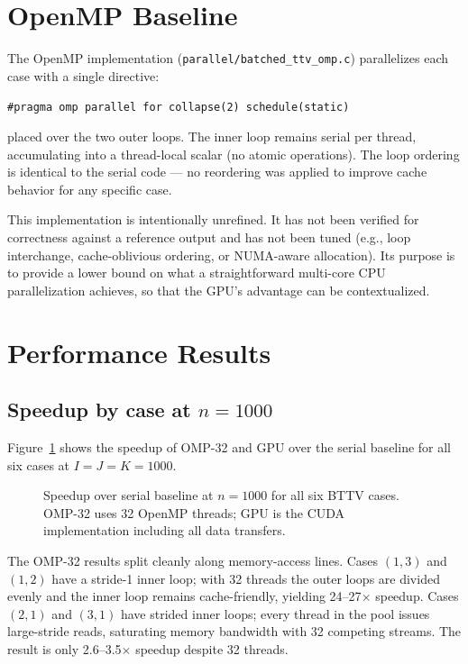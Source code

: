 \documentclass[11pt]{article}
\begin{document}
\section{OpenMP Baseline}

The OpenMP implementation (\texttt{parallel/batched\_ttv\_omp.c})
parallelizes each case with a single directive:
\begin{center}
\texttt{\#pragma omp parallel for collapse(2) schedule(static)}
\end{center}
placed over the two outer loops.  The inner loop remains serial per
thread, accumulating into a thread-local scalar (no atomic operations).
The loop ordering is identical to the serial code --- no reordering was
applied to improve cache behavior for any specific case.

This implementation is intentionally unrefined.  It has not been
verified for correctness against a reference output and has not been
tuned (e.g., loop interchange, cache-oblivious ordering, or NUMA-aware
allocation).  Its purpose is to provide a lower bound on what a
straightforward multi-core CPU parallelization achieves, so that the
GPU's advantage can be contextualized.

\section{Performance Results}

\subsection{Speedup by case at $n = 1000$}

Figure~\ref{fig:speedup} shows the speedup of OMP-32 and GPU over the
serial baseline for all six cases at $I{=}J{=}K{=}1000$.

\begin{figure}[h]
\centering
\resizebox{0.85\linewidth}{!}{}
\caption{Speedup over serial baseline at $n=1000$ for all six BTTV cases.
         OMP-32 uses 32 OpenMP threads; GPU is the CUDA implementation
         including all data transfers.}
\label{fig:speedup}
\end{figure}

The OMP-32 results split cleanly along memory-access lines.  Cases
$(1,3)$ and $(1,2)$ have a stride-1 inner loop; with 32 threads the
outer loops are divided evenly and the inner loop remains cache-friendly,
yielding 24--27$\times$ speedup.  Cases $(2,1)$ and $(3,1)$ have strided
inner loops; every thread in the pool issues large-stride reads, saturating
memory bandwidth with 32 competing streams.  The result is only
2.6--3.5$\times$ speedup despite 32 threads.
\end{document}
